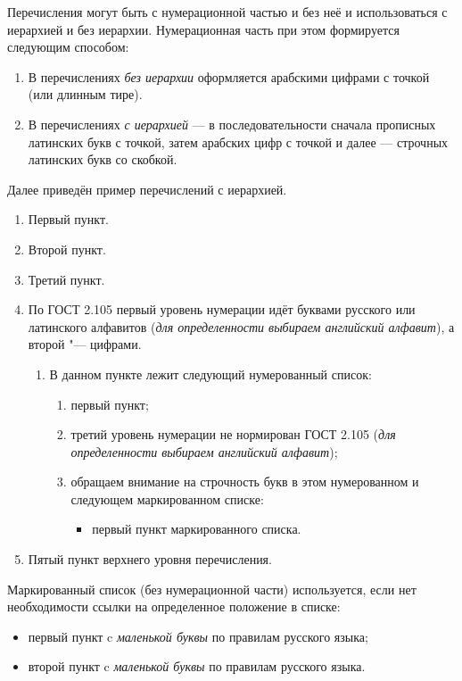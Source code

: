 Перечисления могут быть с нумерационной частью и без неё и использоваться с иерархией и без иерархии. Нумерационная часть при этом формируется следующим способом:

\begin{enumerate}[1.]
	\item В перечислениях {\itshape без иерархии} оформляется арабскими цифрами с точкой (или длинным тире).
	\item В перечислениях {\itshape с иерархией} --- в последовательности сначала прописных латинских букв с точкой, затем арабских цифр с точкой и далее --- строчных латинских букв со скобкой. 
\end{enumerate}





Далее приведён пример перечислений с иерархией.


\begin{enumerate}
	\item Первый пункт.
	\item Второй пункт.
	\item Третий пункт.
	\item По ГОСТ 2.105 первый уровень нумерации идёт буквами русского или латинского алфавитов ({\itshape для определенности выбираем английский алфавит}),
	а второй "--- цифрами. 
	\begin{enumerate}
		\item В данном пункте лежит следующий нумерованный список: 
		\begin{enumerate}
			\item первый пункт;
			\item третий уровень нумерации не нормирован ГОСТ 2.105 ({\itshape для определенности выбираем английский алфавит});
			\item обращаем внимание на строчность букв в этом нумерованном и следующем маркированном списке:
			\begin{itemize}
				\item первый пункт маркированного списка.
			\end{itemize}    
		\end{enumerate}
	\end{enumerate}
	\item Пятый пункт верхнего уровня перечисления.
\end{enumerate}

Маркированный список (без нумерационной части) используется, если нет необходимости ссылки на определенное положение в списке:
\begin{itemize}
	\item первый пункт c {\itshape маленькой буквы} по правилам русского языка;
	\item второй пункт c {\itshape маленькой буквы} по правилам русского языка.
\end{itemize}